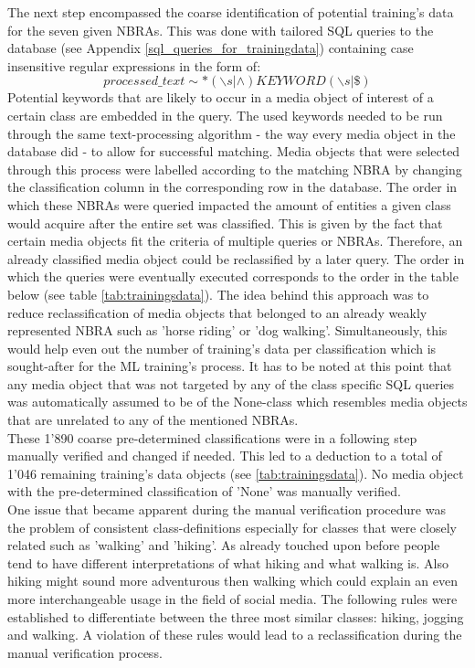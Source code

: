 \newline
The next step encompassed the coarse identification of potential training's data for the seven given NBRAs. This was done with tailored SQL queries to the database (see Appendix \ref{sql_queries_for_trainingdata}) containing case insensitive regular expressions in the form of:
\[processed\_text \sim * (\backslash s | \wedge)KEYWORD(\backslash s | \$)\] 
Potential keywords that are likely to occur in a media object of interest of a certain class are embedded in the query. The used keywords needed to be run through the same text-processing algorithm - the way every media object in the database did - to allow for successful matching. Media objects that were selected through this process were labelled according to the matching NBRA by changing the classification column in the corresponding row in the database. The order in which these NBRAs were queried impacted the amount of entities a given class would acquire after the entire set was classified. This is given by the fact that certain media objects fit the criteria of multiple queries or NBRAs. Therefore, an already classified media object could be reclassified by a later query. The order in which the queries were eventually executed corresponds to the order in the table below (see table \ref{tab:trainingsdata}). The idea behind this approach was to reduce reclassification of media objects that belonged to an already weakly represented NBRA such as 'horse riding' or 'dog walking'. Simultaneously, this would help even out the number of training's data per classification which is sought-after for the ML training's process. It has to be noted at this point that any media object that was not targeted by any of the class specific SQL queries was automatically assumed to be of the None-class which resembles media objects that are unrelated to any of the mentioned NBRAs.\\
These 1'890 coarse pre-determined classifications were in a following step manually verified and changed if needed. This led to a deduction to a total of 1'046 remaining training's data objects (see \ref{tab:trainingsdata}). No media object with the pre-determined classification of 'None' was manually verified.\\
\newline
One issue that became apparent during the manual verification procedure was the problem of consistent class-definitions especially for classes that were closely related such as 'walking' and 'hiking'. As already touched upon before people tend to have different interpretations of what hiking and what walking is. Also hiking might sound more adventurous then walking which could explain an even more interchangeable usage in the field of social media. The following rules were established to differentiate between the three most similar classes: hiking, jogging and walking. A violation of these rules would lead to a reclassification during the manual verification process.


